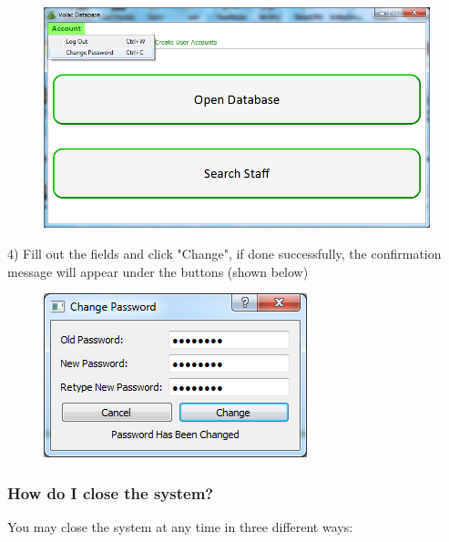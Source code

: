 \begin{figure}[H]
    \includegraphics[width=\textwidth]{./Manual/Images/changepass2.png}
\end{figure}

4) Fill out the fields and click "Change", if done successfully, the confirmation message will appear under the buttons (shown below)

\begin{figure}[H]
    \includegraphics[width=\textwidth]{./Manual/Images/changepass3.png}
\end{figure}


\subsubsection{How do I close the system?}\label{closesys}

You may close the system at any time in three different ways:

